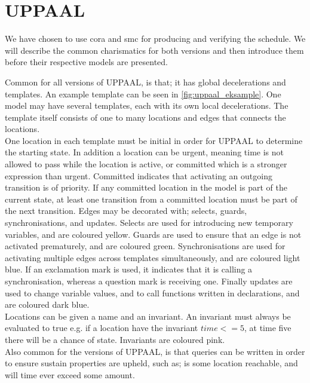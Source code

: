 \section{UPPAAL} \label{sec:uppaal}
We have chosen to use \acrlong{cora}\cite{cs_cora}\cite{cora_tutorial} and \acrlong{smc}\cite{smc_home}\cite{cs_smc} for producing and verifying the schedule. We will describe the common charismatics for both versions and then introduce them before their respective models are presented.

Common for all versions of UPPAAL, is that; it has global decelerations and templates. 
An example template can be seen in \cref{fig:uppaal_eksample}.
One model may have several templates, each with its own local decelerations. The template itself consists of one to many locations and edges that connects the locations.\\
One location in each template must be initial in order for UPPAAL to determine the starting state. In addition a location can be urgent, meaning time is not allowed to pass while the location is active, or committed which is a stronger expression than urgent. Committed indicates that activating an outgoing transition is of priority. If any committed location in the model is part of the current state, at least one transition from a committed location must be part of the next transition.
Edges may be decorated with; selects, guards, synchronisations, and updates. 
Selects are used for introducing new temporary variables, and are coloured yellow.
Guards are used to ensure that an edge is not activated prematurely, and are coloured green.
Synchronisations are used for activating multiple edges across templates simultaneously, and are coloured light blue. If an exclamation mark is used, it indicates that it is calling a synchronisation, whereas a question mark is receiving one.
Finally updates are used to change variable values, and to call functions written in declarations, and are coloured dark blue.\\
Locations can be given a name and an invariant. An invariant must always be evaluated to true e.g. if a location have the invariant $time <= 5$, at time five there will be a chance of state. Invariants are coloured pink.\\
Also common for the versions of UPPAAL, is that queries can be written in order to ensure sustain properties are upheld, such as; is some location reachable, and will time ever exceed some amount.

